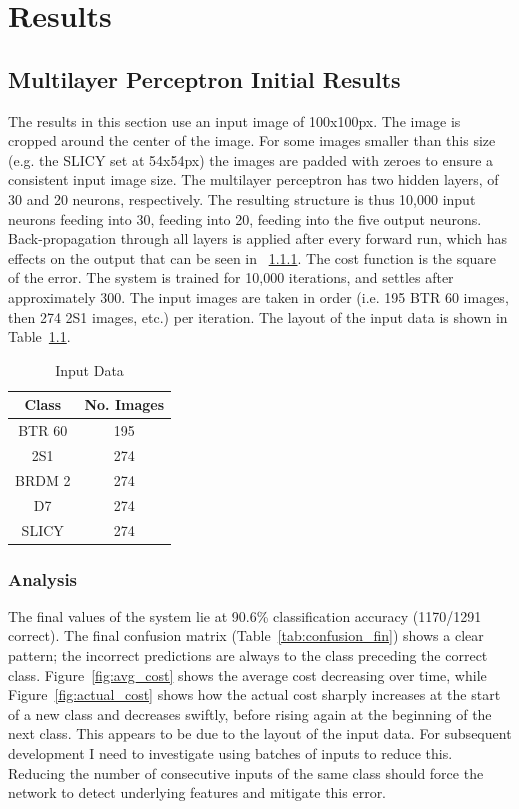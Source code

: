 \chapter{Results}


\section{Multilayer Perceptron Initial Results}
The results in this section use an input image of 100x100px. The image is cropped around the center of the image. For some images smaller than this size (e.g. the SLICY set at 54x54px) the images are padded with zeroes to ensure a consistent input image size. The multilayer perceptron has two hidden layers, of 30 and 20 neurons, respectively. The resulting structure is thus 10,000 input neurons feeding into 30, feeding into 20, feeding into the five output neurons. Back-propagation through all layers is applied after every forward run, which has effects on the output that can be seen in ~\ref{sec:analysis}. The cost function is the square of the error. The system is trained for 10,000 iterations, and settles after approximately 300. The input images are taken in order (i.e. 195 BTR 60 images, then 274 2S1 images, etc.) per iteration. The layout of the input data is shown in Table~\ref{tab:input_data}. \\


\begin{table}
	\centering
	\begin{tabular}{|c|c|}
		\hline
		\textbf{Class} & \textbf{No. Images} \\
		\hline
		
		BTR 60 & 195 \\ \hline
		2S1    & 274 \\ \hline
		BRDM 2 & 274 \\ \hline
		D7     & 274 \\ \hline
		SLICY  & 274 \\ \hline
			
	\end{tabular}
	\caption{Input Data}
	\label{tab:input_data}
	\centering
\end{table}

 

\subsection{Analysis}\label{sec:analysis}

The final values of the system lie at 90.6\% classification accuracy (1170/1291 correct). The final confusion matrix (Table~\ref{tab:confusion_fin}) shows a clear pattern; the incorrect predictions are always to the class preceding the correct class. Figure~\ref{fig:avg_cost} shows the average cost decreasing over time, while Figure~\ref{fig:actual_cost} shows how the actual cost sharply increases at the start of a new class and decreases swiftly, before rising again at the beginning of the next class. This appears to be due to the layout of the input data. For subsequent development I need to investigate using batches of inputs to reduce this. Reducing the number of consecutive inputs of the same class should force the network to detect underlying features and mitigate this error.

